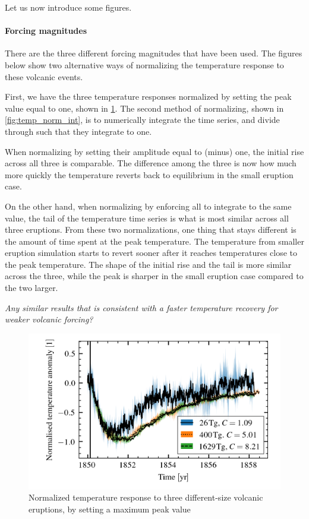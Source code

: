 \documentclass[twocol]{ametsocV5}
\begin{document}
Let us now introduce some figures.

\paragraph{Forcing magnitudes}

There are the three different forcing magnitudes that have been used. The figures below
show two alternative ways of normalizing the temperature response to these volcanic
events.

First, we have the three temperature responses normalized by setting the peak value
equal to one, shown in \cref{fig:temp_norm_max}. The second method of normalizing, shown
in \cref{fig:temp_norm_int}, is to numerically integrate the time series, and divide
through such that they integrate to one.

When normalizing by setting their amplitude equal to (minus) one, the initial rise
across all three is comparable. The difference among the three is now how much more
quickly the temperature reverts back to equilibrium in the small eruption case.

On the other hand, when normalizing by enforcing all to integrate to the same value, the
tail of the temperature time series is what is most similar across all three eruptions.
From these two normalizations, one thing that stays different is the amount of time
spent at the peak temperature. The temperature from smaller eruption simulation starts
to revert sooner after it reaches temperatures close to the peak temperature. The shape
of the initial rise and the tail is more similar across the three, while the peak is
sharper in the small eruption case compared to the two larger.

\emph{Any similar results that is consistent with a faster temperature recovery for
  weaker volcanic forcing?}

\begin{figure}
  \begin{center}
    \includegraphics[width=0.95\linewidth]{figures/compare-waveform-max.png}
  \end{center}
  \caption{Normalized temperature response to three different-size volcanic eruptions,
    by setting a maximum peak value}%
  \label{fig:temp_norm_max}
\end{figure}
\end{document}

